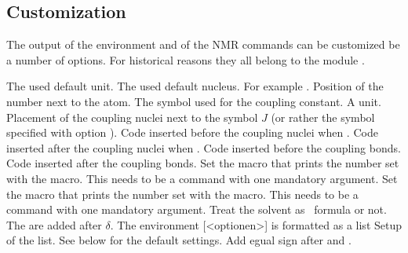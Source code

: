 \documentclass[load-preamble+]{cnltx-doc}
\begin{document}
\subsection{Customization}\label{sec:experimental-customization}

The output of the environment and of the NMR commands can be customized be a
number of options.  For historical reasons they all belong to the module
.
\begin{options}
    The used default unit.
    The used default nucleus.
  \Default
    For example .
    Position of the number next to the atom.
    The symbol used for the coupling constant.
    A  unit.
    Placement of the coupling nuclei next to the symbol
    $J$ (or rather the symbol specified with option
    ).
  \Default{(}
    Code inserted before the coupling nuclei when
    .
  \Default{)}
    Code inserted after the coupling nuclei when
    .
  \Default
    Code inserted before the coupling bonds.
  \Default{\cs*{!}}
    Code inserted after the coupling bonds.
    Set the macro that prints the number set with the
     macro.  This needs to be a command with one mandatory argument.
    Set the macro that prints the number set with the
    \cs{\#} macro.  This needs to be a command with one mandatory argument.
    Treat the solvent as \chemformula\ formula or not.
  \Default
    The  are added after $\delta$.
    The environment [<optionen>]{} is formatted as a list
    Setup of the list. See below for the default settings.
    Add egual sign after  and .
\end{options}
\end{document}
